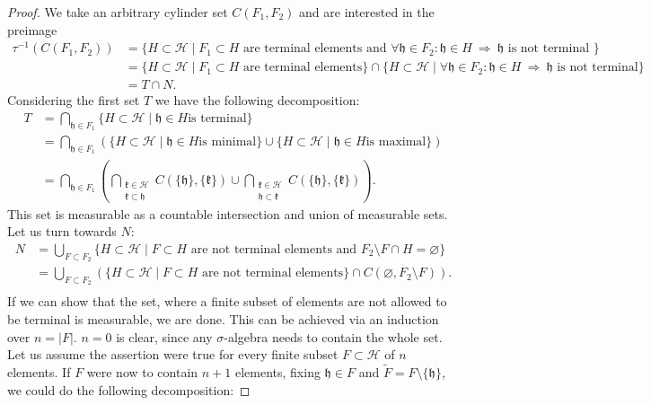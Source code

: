\begin{proof}
  We take an arbitrary cylinder set \(C(F_1, F_2)\) and are interested in the preimage
  \begin{align*}
    \tau^{-1}(C(F_1, F_2))
    & = \{H \subset \mathcal{H} \mid F_1 \subset H \text{ are terminal elements and } \forall \mathfrak{h} \in F_2\colon \mathfrak{h} \in H\ \Rightarrow\ \mathfrak{h} \text{ is not terminal }\} \\
    & = \{H \subset \mathcal{H} \mid F_1 \subset H \text{ are terminal elements}\} \cap \{H \subset \mathcal{H} \mid \forall \mathfrak{h} \in F_2\colon \mathfrak{h} \in H\ \Rightarrow\ \mathfrak{h} \text{ is not terminal}\}\\
    & = T \cap N.
  \end{align*}
  Considering the first set \(T\) we have the following decomposition:
  \begin{align*}
    T
    & = \bigcap_{\mathfrak{h} \in F_1}\{H \subset \mathcal{H} \mid \mathfrak{h} \in H \text{is terminal}\}\\
    & = \bigcap_{\mathfrak{h} \in F_1}\left (\{H \subset \mathcal{H} \mid \mathfrak{h} \in H \text{is minimal}\} \cup \{H \subset \mathcal{H} \mid \mathfrak{h} \in H \text{is maximal}\}\right )\\
    & = \bigcap_{\mathfrak{h} \in F_1}\left ( \bigcap_{\substack{\mathfrak{k} \in \mathcal{H}\\\mathfrak{k} \subset \mathfrak{h}}}C(\{\mathfrak{h}\}, \{\mathfrak{k}\}) \cup \bigcap_{\substack{\mathfrak{k} \in \mathcal{H}\\\mathfrak{h} \subset\mathfrak{k}}} C(\{\mathfrak{h}\}, \{\mathfrak{k}\})\right ).
  \end{align*}
  This set is measurable as a countable intersection and union of measurable sets. Let us turn towards \(N\):
  \begin{align*}
    N
    & = \bigcup_{F \subset F_2} \{H \subset \mathcal{H} \mid F \subset H \text{ are not terminal elements and } F_2 \setminus F \cap H = \varnothing\}\\
    & = \bigcup_{F \subset F_2} \left ( \{H \subset \mathcal{H} \mid F \subset H \text{ are not terminal elements}\} \cap C(\varnothing, F_2 \setminus F)\right).\\
  \end{align*}
  If we can show that the set, where a finite subset of elements are not allowed to be terminal is measurable, we are done. This can be achieved via an induction over \(n = |F|\). \(n = 0\) is clear, since any \(\sigma\)-algebra needs to contain the whole set. Let us assume the assertion were true for every finite subset \(F \subset \mathcal{H}\) of \(n\) elements. If \(F\) were now to contain \(n+1\) elements, fixing \(\mathfrak{h} \in F\) and \(\tilde F = F \setminus \{\mathfrak{h}\}\), we could do the following decomposition:

\end{proof}
